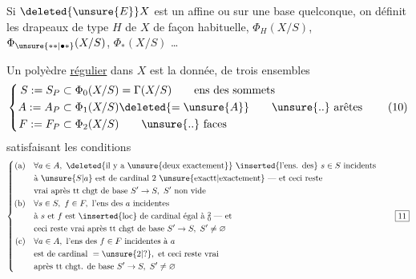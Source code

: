 Si $\deleted{\unsure{E}}X$ est un   affine ou    sur une base quelconque, on définit les drapeaux de type $H$  de $X$ de façon habituelle,  $\Phi_H(X/S)$, $\Phi_{\unsure{**|\bullet *}}(X/S)$, $\Phi_*(X/S)$ \ldots
{}

Un polyèdre \uline{régulier}   dans $X$ est la donnée,  de trois ensembles 
\[
 \left\{\begin{aligned}
 S:=S_P&\subset\Phi_0(X/S)=\Gamma(X/S)\qquad\text{ens des sommets}\\
 A:=A_P&\subset\Phi_1(X/S)\deleted{=\unsure{A}}\qquad\text{\unsure{..} arêtes}\\
 F:=F_P&\subset\Phi_2(X/S)\qquad\text{\unsure{..} faces}
 \end{aligned}\right.\tag*{(10)}
\]
satisfaisant les conditions
\[
 \left\{\begin{aligned}
 \text{(a)}\quad &\forall a\in A,\ \text{\deleted{il y a \unsure{deux exactement}} \inserted{l'ens. des}}\ s\in S\ \text{incidents}\\
 &\text{à }\unsure{S|a}\text{ est de cardinal 2 \unsure{exactt|exactement} --- et ceci reste}\\
 &\text{vrai après }\text{tt chgt de base }S'\to S,\ S'\text{ non vide}\\
 \text{(b)}\quad &\forall s\in S,\ f\in F,\ \text{l'ens des }a\text{ incidentes}\\
 &\text{à }s\text{ et }f\text{ est \inserted{loc} de cardinal égal à }\substack{2\\0}\text{ --- et}\\
 &\text{ceci reste vrai après }\text{tt chgt de base }S'\to S,\ S'\ne\varnothing\\
 \text{(c)}\quad &\forall a\in A,\ \text{l'ens des }f\in F\text{ incidentes à }a\\
 &\text{est de cardinal }=\unsure{2|?},\ \text{et ceci reste vrai}\\
 &\text{après }\text{tt chgt. de base }S'\to S,\ S'\ne\varnothing
 \end{aligned}\right.\tag*{\boxed{11}}
\]

